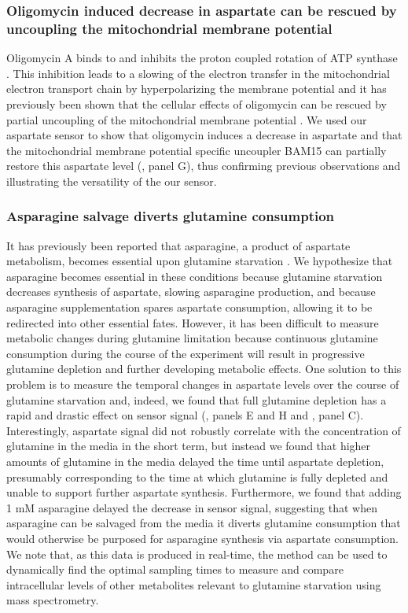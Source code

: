 \documentclass[9pt,lineno]{elife}
\begin{document}
\subsubsection{Oligomycin induced decrease in aspartate can be rescued by uncoupling the mitochondrial membrane potential}
Oligomycin A binds to and inhibits the proton coupled rotation of ATP synthase \citep{Symersky2012-dv}.
This inhibition leads to a slowing of the electron transfer in the mitochondrial electron transport chain by hyperpolarizing the membrane potential \citep{Brand2011-ms} and it has previously been shown that the cellular effects of oligomycin can be rescued by partial uncoupling of the mitochondrial membrane potential \citep{Sullivan2015-xf, To2019-sg}.
We used our aspartate sensor to show that oligomycin induces a decrease in aspartate and that the mitochondrial membrane potential specific uncoupler BAM15 \citep{Kenwood2014-ni} can partially restore this aspartate level (, panel G), thus confirming previous observations and illustrating the versatility of the our sensor.




\subsubsection{Asparagine salvage diverts glutamine consumption}
It has previously been reported that asparagine, a product of aspartate metabolism, becomes essential upon glutamine starvation \citep{Pavlova2018-nl, Zhang2014-zz}.
We hypothesize that asparagine becomes essential in these conditions because glutamine starvation decreases synthesis of aspartate, slowing asparagine production, and because asparagine supplementation spares aspartate consumption, allowing it to be redirected into other essential fates.
However, it has been difficult to measure metabolic changes during glutamine limitation because continuous glutamine consumption during the course of the experiment will result in progressive glutamine depletion and further developing metabolic effects.
One solution to this problem is to measure the temporal changes in aspartate levels over the course of glutamine starvation and, indeed, we found that full glutamine depletion has a rapid and drastic effect on sensor signal (, panels E and H and , panel C).
Interestingly, aspartate signal did not robustly correlate with the concentration of glutamine in the media in the short term, but instead we found that higher amounts of glutamine in the media delayed the time until aspartate depletion, presumably corresponding to the time at which glutamine is fully depleted and unable to support further aspartate synthesis.
Furthermore, we found that adding 1 mM asparagine delayed the decrease in sensor signal, suggesting that when asparagine can be salvaged from the media it diverts glutamine consumption that would otherwise be purposed for asparagine synthesis via aspartate consumption.
We note that, as this data is produced in real-time, the method can be used to dynamically find the optimal sampling times to measure and compare intracellular levels of other metabolites relevant to glutamine starvation using mass spectrometry.
\end{document}
